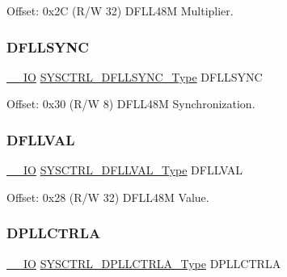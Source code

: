 Offset\+: 0x2C (R/W 32) D\+F\+L\+L48M Multiplier. 

\mbox{\label{struct_sysctrl_a92c0b2513c4e5c8871748ba38cf71691}} 
\subsubsection{\texorpdfstring{DFLLSYNC}{DFLLSYNC}}
{\footnotesize\ttfamily \mbox{\hyperlink{core__cm0plus_8h_aec43007d9998a0a0e01faede4133d6be}{\+\_\+\+\_\+\+IO}} \mbox{\hyperlink{union_s_y_s_c_t_r_l___d_f_l_l_s_y_n_c___type}{S\+Y\+S\+C\+T\+R\+L\+\_\+\+D\+F\+L\+L\+S\+Y\+N\+C\+\_\+\+Type}} D\+F\+L\+L\+S\+Y\+NC}



Offset\+: 0x30 (R/W 8) D\+F\+L\+L48M Synchronization. 

\mbox{\label{struct_sysctrl_a6dba2cdd1024de2cac3543ddccd3c78a}} 
\subsubsection{\texorpdfstring{DFLLVAL}{DFLLVAL}}
{\footnotesize\ttfamily \mbox{\hyperlink{core__cm0plus_8h_aec43007d9998a0a0e01faede4133d6be}{\+\_\+\+\_\+\+IO}} \mbox{\hyperlink{union_s_y_s_c_t_r_l___d_f_l_l_v_a_l___type}{S\+Y\+S\+C\+T\+R\+L\+\_\+\+D\+F\+L\+L\+V\+A\+L\+\_\+\+Type}} D\+F\+L\+L\+V\+AL}



Offset\+: 0x28 (R/W 32) D\+F\+L\+L48M Value. 

\mbox{\label{struct_sysctrl_aa8587a145ac2dff5a1425faf5bc7c6c0}} 
\subsubsection{\texorpdfstring{DPLLCTRLA}{DPLLCTRLA}}
{\footnotesize\ttfamily \mbox{\hyperlink{core__cm0plus_8h_aec43007d9998a0a0e01faede4133d6be}{\+\_\+\+\_\+\+IO}} \mbox{\hyperlink{union_s_y_s_c_t_r_l___d_p_l_l_c_t_r_l_a___type}{S\+Y\+S\+C\+T\+R\+L\+\_\+\+D\+P\+L\+L\+C\+T\+R\+L\+A\+\_\+\+Type}} D\+P\+L\+L\+C\+T\+R\+LA}



